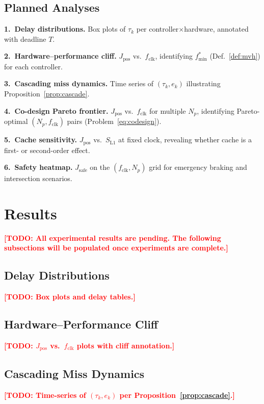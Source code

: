 \documentclass[conference]{IEEEtran}
\newcommand{\TODO}[1]{\textcolor{red}{\textbf{[TODO: #1]}}}
\begin{document}
\subsection{Planned Analyses}

\noindent\textbf{1.\ Delay distributions.}
Box plots of $\tau_k$ per controller$\times$hardware, annotated with
deadline $T$.

\noindent\textbf{2.\ Hardware--performance cliff.}
$J_\text{pos}$ vs.\ $f_\text{clk}$, identifying $f_\text{min}^*$
(Def.~\ref{def:mvh}) for each controller.

\noindent\textbf{3.\ Cascading miss dynamics.}
Time series of $(\tau_k, e_k)$ illustrating
Proposition~\ref{prop:cascade}.

\noindent\textbf{4.\ Co-design Pareto frontier.}
$J_\text{pos}$ vs.\ $f_\text{clk}$ for multiple $N_p$, identifying
Pareto-optimal $(N_p, f_\text{clk})$ pairs (Problem~\eqref{eq:codesign}).

\noindent\textbf{5.\ Cache sensitivity.}
$J_\text{pos}$ vs.\ $S_\text{L1}$ at fixed clock, revealing whether
cache is a first- or second-order effect.

\noindent\textbf{6.\ Safety heatmap.}
$J_\text{safe}$ on the $(f_\text{clk}, N_p)$ grid for emergency
braking and intersection scenarios.

\section{Results}\label{sec:results}

\TODO{All experimental results are pending.  The following subsections
  will be populated once experiments are complete.}

\subsection{Delay Distributions}
\TODO{Box plots and delay tables.}

\subsection{Hardware--Performance Cliff}
\TODO{$J_\text{pos}$ vs.\ $f_\text{clk}$ plots with cliff annotation.}

\subsection{Cascading Miss Dynamics}
\TODO{Time-series of $(\tau_k, e_k)$ per
  Proposition~\ref{prop:cascade}.}
\end{document}
